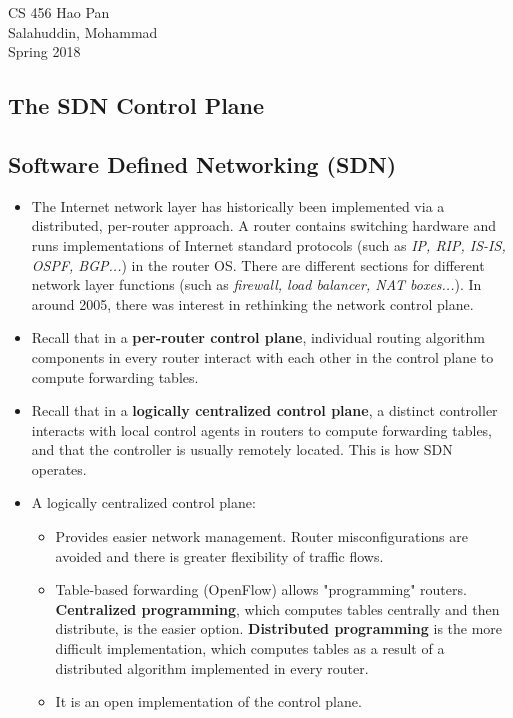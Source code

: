 \documentclass{article}
\begin{document}
\noindent
{CS 456 \hfill Hao Pan}\\
{Salahuddin, Mohammad}\\
{Spring 2018}


\begin{center}
\section{The SDN Control Plane}
\noindent
\end{center}

\subsection{Software Defined Networking (SDN)}

\begin{itemize}
\item The Internet network layer has historically been implemented via a distributed, per-router approach. A router contains switching hardware and runs implementations of Internet standard protocols (such as \emph{IP, RIP, IS-IS, OSPF, BGP...}) in the router OS. There are different sections for different network layer functions (such as \emph{firewall, load balancer, NAT boxes...}). In around 2005, there was interest in rethinking the network control plane.
\item Recall that in a {\bf per-router control plane}, individual routing algorithm components in every router interact with each other in the control plane to compute forwarding tables.
\item Recall that in a {\bf logically centralized control plane}, a distinct controller interacts with local control agents in routers to compute forwarding tables, and that the controller is usually remotely located. This is how SDN operates.
\item A logically centralized control plane:
\begin{itemize}
\item Provides easier network management. Router misconfigurations are avoided and there is greater flexibility of traffic flows.
\item Table-based forwarding (OpenFlow) allows "programming" routers. {\bf Centralized programming}, which computes tables centrally and then distribute, is the easier option. {\bf Distributed programming} is the more difficult implementation, which computes tables as a result of a distributed algorithm implemented in every router.
\item It is an open implementation of the control plane.
\end{itemize}
\end{itemize}
\end{document}
